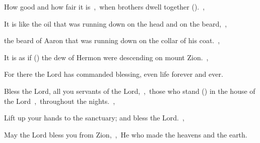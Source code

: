 \documentclass[12pt,twoside,a5paper]{article}
\begin{document}

\begin{normalparskip}
  How good and how fair it is~\sep\ when brothers dwell together ().~\sep


  It is like the oil that was running down on the head and on the beard,~\sep

  the beard of Aaron that was running down on the collar of his coat.~\sep

  It is as if () the dew of Hermon were descending on mount Zion.~\sep

  For there the Lord has commanded blessing, even life forever and ever.
\end{normalparskip}


\begin{normalparskip}
  Bless the Lord, all you servants of the Lord,~\sep\ those who stand () in the house of the Lord~\sep\ throughout the nights.~\sep


  Lift up your hands to the sanctuary; and bless the Lord.~\sep

  May the Lord bless you from Zion,~\sep\ He who made the heavens and the earth.
\end{normalparskip}

\end{document}
